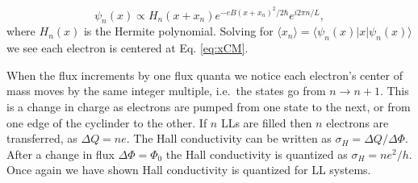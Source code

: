 \begin{equation}
  \psi_n(x) \propto H_n (x+x_n) e^{-eB(x+x_n)^2 / 2\hbar} e^{i2\pi n/L},
\end{equation}
where $H_n(x)$ is the Hermite polynomial.
Solving for $\langle x_n \rangle = \langle \psi_n(x) | x | \psi_n(x) \rangle$ we see each electron is centered at Eq. \eqref{eq:xCM}.

When the flux increments by one flux quanta we notice each electron's center of mass moves by the same integer multiple, i.e.\ the states go from $n\rightarrow n+1$.
This is a change in charge as electrons are pumped from one state to the next, or from one edge of the cyclinder to the other.
If $n$ LLs are filled then $n$ electrons are transferred, as $\Delta Q = ne$.
The Hall conductivity can be written as $\sigma_H = \Delta Q / \Delta \Phi$.
After a change in flux $\Delta \Phi = \Phi_0$ the Hall conductivity is quantized as $\sigma_H = ne^2 / h$.
Once again we have shown Hall conductivity is quantized for LL systems.

